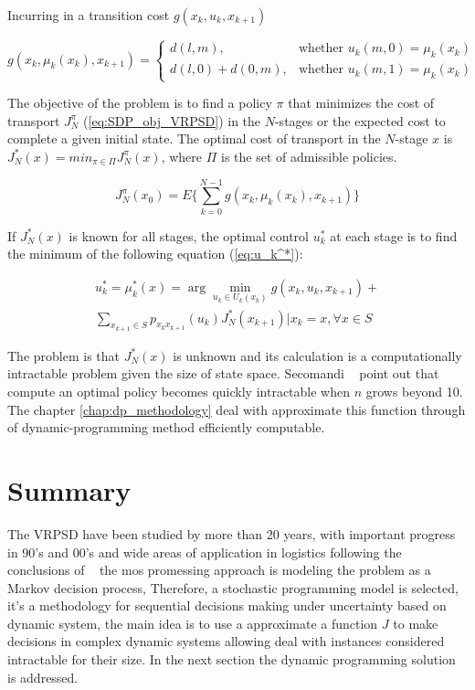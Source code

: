 Incurring in a transition cost $g(x_k,u_k,x_{k+1})$

\begin{equation}\label{eq:costg}
    g(x_k,\mu_k(x_k),x_{k+1}) = \left \{ \begin{array}{ll}
    d(l,m), & \text{whether } u_k(m,0)=\mu_k(x_k)\\
    d(l,0) + d(0,m), & \text{whether } u_k(m,1)=\mu_k(x_k)
    \end{array} \right.
 \end{equation}

The objective of the problem is to find a policy $\pi$ that minimizes the cost of transport $J_N^\pi$ (\ref{eq:SDP_obj_VRPSD}) in the $N$-stages or the expected cost to complete a given initial state. The optimal cost of transport in the $N$-stage $x$ is  $J_N^*(x) = min_{\pi\in \Pi}J_N^\pi(x)$, where $\Pi$ is the set of admissible policies. 

\begin{equation}\label{eq:SDP_obj_VRPSD}
 J_N^\pi(x_0)=E\biggr\{\sum_{k=0}^{N-1}g(x_k,\mu_k(x_k),x_{k+1})\biggr\}
\end{equation}

If $J_N^*(x)$ is known for all stages, the optimal control $u_k^*$ at each stage is to find the minimum of the following equation (\ref{eq:u_k^*}):

\begin{multline}\label{eq:u_k^*}
     u_k^*=\mu_k^*(x)=
\arg\min\limits_{u_k \in U_k(x_k)}g(x_k,u_k,x_{k+1})+\\
\sum_{x_{k+1}\in S}p_{x_kx_{k+1}}(u_k)J_N^*(x_{k+1})|x_k=x, \forall x\in S
\end{multline}

The problem is that $J_N^*(x)$ is unknown and its calculation is a computationally intractable problem given the size of state space. Secomandi ~\cite{secomandi_rollout_2001} point out that compute an optimal policy becomes quickly intractable when $n$ grows beyond 10. The chapter \ref{chap:dp_methodology} deal with approximate this function through of dynamic-programming method efficiently computable.

\section{Summary}

The VRPSD have been studied by more than 20 years, with important progress in 90's and 00's and wide areas of application in logistics following the conclusions of ~\cite{Dror_2005} the mos promessing approach is modeling the problem as a Markov decision process, Therefore, a stochastic programming model is selected, it's a methodology for sequential decisions making under uncertainty based on dynamic system, the main idea is to use a approximate a function $J$ to make decisions in complex dynamic systems allowing deal with instances considered intractable for their size. In the next section the dynamic programming solution is addressed.